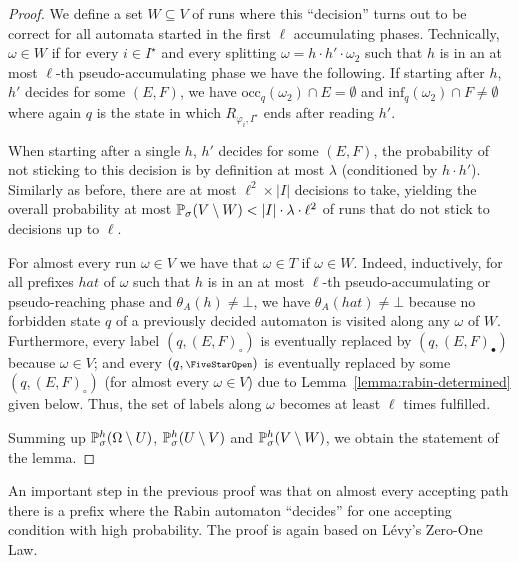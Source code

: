 \documentclass[a4paper,UKenglish]{lipics}
\newcommand{\symbopen}{\text{\scriptsize\FiveStarOpen}}
\newcommand{\Prb}[2][]{\ifblank{#1}{\mathbb{P}_{#2}}{\mathbb{P}^{#1}_{#2}}}
\renewcommand{\Pr}[3][]{\ifblank{#1}{\mathbb{P}_{#2}}{\mathbb{P}^{#1}_{#2}}(#3)}
\newcommand{\rabin}{R}
\newcommand{\fix}[1]{{#1^\star}}
\newcommand{\fixI}{\fix{I}}
\newcommand{\thetaa}{\theta_A}
\newcommand{\occu}{\mathrm{occ}}
\newcommand{\infi}{\mathrm{inf}}
\begin{document}
\begin{proof}
	We define a set $W \subseteq V$ of runs where this ``decision'' turns out to be correct for all automata started in the first $\ell$ accumulating phases. Technically, $\omega \in W$ if for every $i\in \fixI$ and every splitting $\omega = h\cdot h' \cdot \omega_2$ such that $h$ is in an at most $\ell$-th pseudo-accumulating phase we have the following. If starting after $h$, $h'$ decides for some $(E,F)$, we have $\occu_{q}(\omega_2)\cap E = \emptyset$ and $\infi_{q}(\omega_2) \cap F \neq \emptyset$ where again $q$ is the state in which $\rabin_{\varphi_i,\fixI}$ ends after reading $h'$. 
	
	When starting after a single $h$, $h'$ decides for some $(E,F)$, the probability of not sticking to this decision is by definition at most $\lambda$ (conditioned by $h\cdot h'$). Similarly as before, there are at most $\ell^2 \times |I|$ decisions to take, yielding the overall probability at most $\Pr{\sigma}{V \setminus W} < |I|\cdot \lambda\cdot \ell^2$ of runs that do not stick to decisions up to $\ell$.
	
	For almost every run $\omega \in V$ we have that $\omega \in T$ if $\omega \in W$. Indeed, inductively, for all prefixes $h a t$ of $\omega$ such that $h$ is in an at most $\ell$-th pseudo-accumulating or pseudo-reaching phase and $\thetaa(h) \neq \bot$, we have $\thetaa(h a t) \neq \bot$ because no forbidden state $q$ of a previously decided automaton is visited along any $\omega$ of $W$. Furthermore, every label $(q,(E,F)_\circ)$ is eventually replaced by $(q,(E,F)_\bullet)$ because $\omega \in V$; and every $(q,\symbopen)$ is eventually replaced by some $(q,(E,F)_\circ)$ (for almost every $\omega \in V$) due to Lemma~\ref{lemma:rabin-determined} given below. Thus, the set of labels along $\omega$ becomes at least $\ell$ times fulfilled.
	
	Summing up $\Prb[h]{\sigma}(\Omega \setminus U)$, $\Prb[h]{\sigma}(U \setminus V)$ and $\Prb[h]{\sigma}(V \setminus W)$, we obtain the statement of the lemma.
\end{proof}

An important step in the previous proof was that on almost every accepting path there is a prefix where the Rabin automaton ``decides'' for one accepting condition with high probability.
The proof is again based on Lévy's Zero-One Law.
\end{document}
